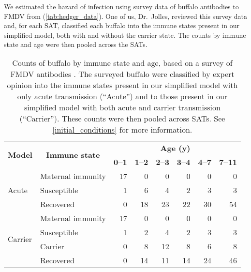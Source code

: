 \documentclass[12pt, USenglish]{article}  %
\begin{document}
We estimated the hazard of infection using survey data of buffalo
antibodies to FMDV from \citeauthor{hedger_1972} \autocite{hedger_1972}
(\autoref{tab:hedger_data}). One of us, Dr.~Jolles, reviewed this
survey data and, for each SAT, classified each buffalo into the immune
states present in our simplified model, both with and without the
carrier state. The counts by immune state and age were then pooled
across the SATs.

\begin{table}
  \centering
  \begin{tabular}{|l|l|rrrrrr|}
    \hline
    \multicolumn{1}{|c}{\multirow{2}{*}{\textbf{Model}}}
    & \multicolumn{1}{|c}{\multirow{2}{*}{\textbf{Immune state}}}
    & \multicolumn{6}{|c|}{\textbf{Age (y)}} \\
    & & \multicolumn{1}{|c}{\textbf{0--1}}
    & \multicolumn{1}{c}{\textbf{1--2}}
    & \multicolumn{1}{c}{\textbf{2--3}}
    & \multicolumn{1}{c}{\textbf{3--4}}
    & \multicolumn{1}{c}{\textbf{4--7}}
    & \multicolumn{1}{c|}{\textbf{7--11}} \\
    \hline
    \multirow{3}{*}{Acute}
    & Maternal immunity & 17 & 0 & 0 & 0 & 0 & 0 \\
    & Susceptible & 1 & 6 & 4 & 2 & 3 & 3 \\
    & Recovered & 0 & 18 & 23 & 22 & 30 & 54 \\
    \hline
    \multirow{4}{*}{Carrier}
    & Maternal immunity & 17 & 0 & 0 & 0 & 0 & 0 \\
    & Susceptible & 1 & 2 & 4 & 2 & 3 & 3 \\
    & Carrier & 0 & 8 & 12 & 8 & 6 & 8 \\
    & Recovered & 0 & 14 & 11 & 14 & 24 & 46 \\
    \hline
  \end{tabular}
  \caption{Counts of buffalo by immune state and age, based on a
    survey of FMDV antibodies \autocite{hedger_1972}.  The surveyed
    buffalo were classified by expert opinion into the immune states
    present in our simplified model with only acute transmission
    (\enquote{Acute}) and to those present in our simplified model
    with both acute and carrier transmission
    (\enquote{Carrier}). These counts were then pooled across
    SATs. See \autoref{initial_conditions} for more information.}
  \label{tab:hedger_data}
\end{table}
\end{document}
